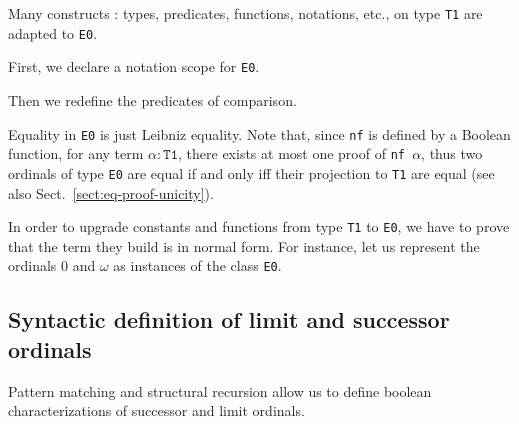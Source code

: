 


Many constructs : types, predicates, functions, notations, etc., on type \texttt{T1} are adapted to \texttt{E0}.

First, we declare a notation scope for \texttt{E0}.





Then we redefine the predicates of comparison.

\label{Predicates:Lt-E0}






Equality in \texttt{E0} is just Leibniz equality. Note that, since \texttt{nf} is
defined by a Boolean function, for  any term $\alpha:\texttt{T1}$, there exists at most one proof of \texttt{nf $\alpha$}, thus two ordinals of type \texttt{E0} are
equal if and only iff their projection to \texttt{T1} are equal (see also Sect.~\vref{sect:eq-proof-unicity}).

\vspace{4pt}






\vspace{4pt}



\vspace{4pt}

In order to  upgrade constants and functions from type \texttt{T1} to \texttt{E0}, we have to prove that
the term they build is in normal form.
For instance, let us represent the ordinals $0$ and $\omega$   as instances of the class \texttt{E0}.

\vspace{4pt}

\label{sect:omega-T1}








\subsection{Syntactic definition of limit and successor ordinals}

Pattern matching and structural recursion allow us to define boolean characterizations  of successor and limit ordinals.


